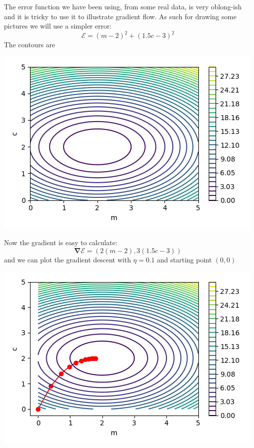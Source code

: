 \documentclass[12pt]{article}
\begin{document}
The error function we have been using, from some real data, is very oblong-ish and it is tricky to use it to illustrate gradient flow. As such for drawing some pictures we will use a simpler error:
\begin{equation}
  \mathcal{E}=(m-2)^2+(1.5c-3)^2
\end{equation}
The contours are
\begin{center}
  \includegraphics[]{02.3_simple_contour.png}
  \end{center}
Now the gradient is easy to calculate:
\begin{equation}
  \boldsymbol{\nabla} \mathcal{E}=\left(2(m-2),3(1.5c-3)\right)
\end{equation}
and we can plot the gradient descent with $\eta=0.1$ and starting point $(0,0)$
\begin{center}
  \includegraphics[]{02.3_gradient.png}
  \end{center}
\end{document}
